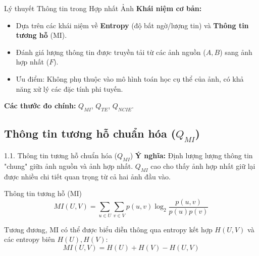 \documentclass{beamer}
\begin{document}
\begin{frame}{Lý thuyết Thông tin trong Hợp nhất Ảnh}
    \textbf{Khái niệm cơ bản:}
    \begin{itemize}
        \item Dựa trên các khái niệm về \textbf{Entropy} (độ bất ngờ/lượng tin) và \textbf{Thông tin tương hỗ} (MI).
        \item Đánh giá lượng thông tin được truyền tải từ các ảnh nguồn ($A, B$) sang ảnh hợp nhất ($F$).
        \item Ưu điểm: Không phụ thuộc vào mô hình toán học cụ thể của ảnh, có khả năng xử lý các đặc tính phi tuyến.
    \end{itemize}
    
    \vspace{0.4cm}
    \textbf{Các thước đo chính:} $Q_{MI}$, $Q_{TE}$, $Q_{NCIE}$.
\end{frame}

\subsection{Thông tin tương hỗ chuẩn hóa ($Q_{MI}$)}

\begin{frame}{1.1. Thông tin tương hỗ chuẩn hóa ($Q_{MI}$)}
    \textbf{Ý nghĩa:} Định lượng lượng thông tin "chung" giữa ảnh nguồn và ảnh hợp nhất. $Q_{MI}$ cao cho thấy ảnh hợp nhất giữ lại được nhiều chi tiết quan trọng từ cả hai ảnh đầu vào.

    \begin{block}{Thông tin tương hỗ (MI)}
    \begin{equation}
        MI(U,V) = \sum_{u \in U} \sum_{v \in V} p(u,v) \log_2 \frac{p(u,v)}{p(u)p(v)}
    \end{equation}
    \end{block}

    Tương đương, MI có thể được biểu diễn thông qua entropy kết hợp $H(U,V)$ và các entropy biên $H(U), H(V)$:
    \begin{equation}
        MI(U,V) = H(U) + H(V) - H(U,V)
    \end{equation}
\end{frame}
\end{document}

